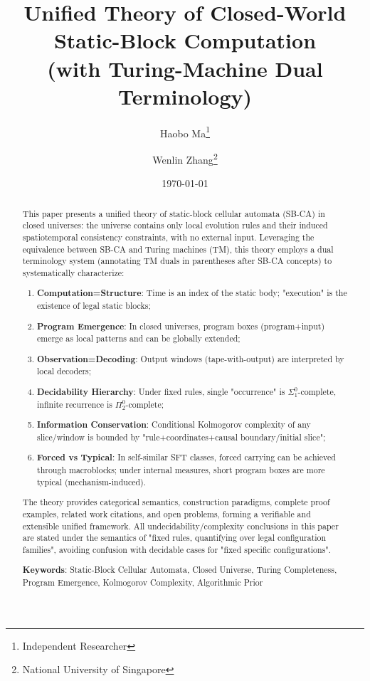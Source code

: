 \documentclass[12pt]{article}
\title{Unified Theory of Closed-World Static-Block Computation \\
(with Turing-Machine Dual Terminology)}
\author{Haobo Ma\thanks{Independent Researcher} \and Wenlin Zhang\thanks{National University of Singapore}}
\date{\today}
\theoremstyle{plain}
\theoremstyle{definition}
\begin{document}
\maketitle

\begin{abstract}
This paper presents a unified theory of static-block cellular automata (SB-CA) in closed universes: the universe contains only local evolution rules and their induced spatiotemporal consistency constraints, with no external input. Leveraging the equivalence between SB-CA and Turing machines (TM), this theory employs a dual terminology system (annotating TM duals in parentheses after SB-CA concepts) to systematically characterize:

\begin{enumerate}
\item \textbf{Computation=Structure}: Time is an index of the static body; "execution" is the existence of legal static blocks;
\item \textbf{Program Emergence}: In closed universes, program boxes (program+input) emerge as local patterns and can be globally extended;
\item \textbf{Observation=Decoding}: Output windows (tape-with-output) are interpreted by local decoders;
\item \textbf{Decidability Hierarchy}: Under fixed rules, single "occurrence" is $\Sigma_1^0$-complete, infinite recurrence is $\Pi_2^0$-complete;
\item \textbf{Information Conservation}: Conditional Kolmogorov complexity of any slice/window is bounded by "rule+coordinates+causal boundary/initial slice";
\item \textbf{Forced vs Typical}: In self-similar SFT classes, forced carrying can be achieved through macroblocks; under internal measures, short program boxes are more typical (mechanism-induced).
\end{enumerate}

The theory provides categorical semantics, construction paradigms, complete proof examples, related work citations, and open problems, forming a verifiable and extensible unified framework. All undecidability/complexity conclusions in this paper are stated under the semantics of "fixed rules, quantifying over legal configuration families", avoiding confusion with decidable cases for "fixed specific configurations".

\textbf{Keywords}: Static-Block Cellular Automata, Closed Universe, Turing Completeness, Program Emergence, Kolmogorov Complexity, Algorithmic Prior
\end{abstract}
\end{document}
